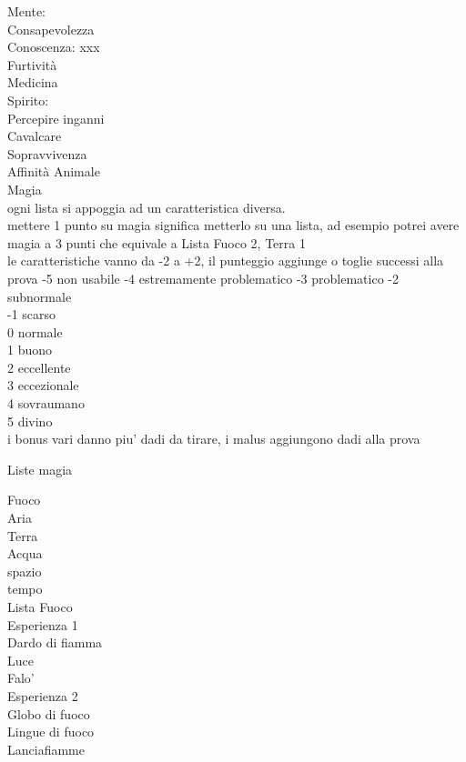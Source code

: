 \documentclass[12pt,a4paper]{book}
\begin{document}
Mente:\\
Consapevolezza\\
Conoscenza: xxx\\
Furtività\\
Medicina\\

Spirito:\\
Percepire inganni\\
Cavalcare\\
Sopravvivenza\\
Affinità Animale\\

Magia\\
ogni lista si appoggia ad un caratteristica diversa.\\
mettere 1 punto su magia significa metterlo su una lista, ad esempio potrei avere magia a 3 punti che equivale a Lista Fuoco 2, Terra 1\\

le caratteristiche vanno da -2 a +2, il punteggio aggiunge o toglie successi alla prova
-5 non usabile				
-4 estremamente problematico		
-3 problematico				
-2 subnormale\\				
-1 scarso\\				
0 normale\\
1 buono\\
2 eccellente\\
3 eccezionale\\
4 sovraumano\\
5 divino\\


i bonus vari danno piu' dadi da tirare, i malus aggiungono dadi alla prova

Liste magia

Fuoco\\
Aria\\
Terra \\
Acqua\\
spazio\\
tempo\\

Lista Fuoco\\

Esperienza 1\\
Dardo di fiamma\\
Luce\\
Falo'\\

Esperienza 2\\
Globo di fuoco\\
Lingue di fuoco\\
Lanciafiamme\\
\end{document}
